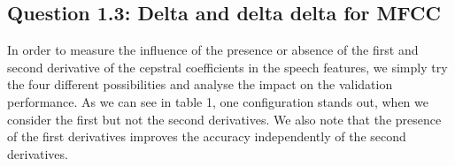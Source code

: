 \documentclass[9pt,twocolumn,letterpaper]{article}
\begin{document}
\begin{table}
\begin{center}
\end{center}
\caption{{\bf Influence of Normalisation.} We compare the accuracy on the validation set with three different normalisation methods, per- and across channel.}
\end{table}

\subsection{Question 1.3: Delta and delta delta for MFCC}
In order to measure the influence of the presence or absence of the first and second derivative of the cepstral coefficients in the speech features, we simply try the four different possibilities and analyse the impact on the validation performance.  As we can see in table 1, one configuration stands out, when we consider the first but not the second derivatives. We also note that the presence of the first derivatives improves the accuracy independently of the second derivatives.
\end{document}
